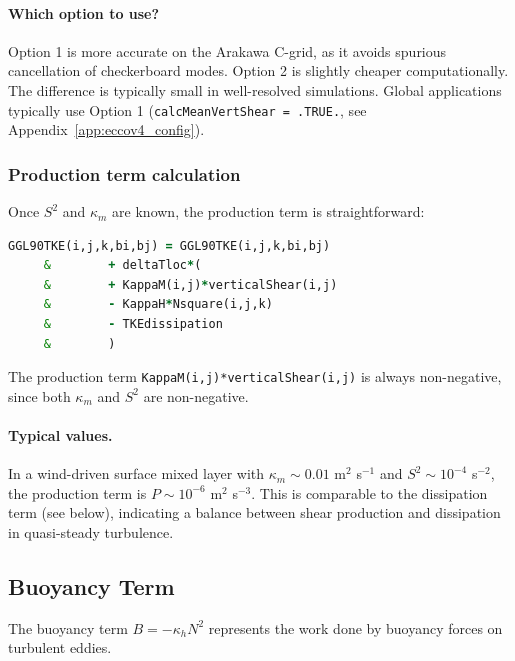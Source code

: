 \documentclass[12pt,letterpaper]{article}
\begin{document}
\paragraph{Which option to use?} Option 1 is more accurate on the Arakawa C-grid, as it avoids spurious cancellation of checkerboard modes. Option 2 is slightly cheaper computationally. The difference is typically small in well-resolved simulations. Global applications typically use Option 1 (\verb|calcMeanVertShear = .TRUE.|, see Appendix~\ref{app:eccov4_config}).

\subsubsection{Production term calculation}

Once $S^2$ and $\kappa_m$ are known, the production term is straightforward:

\begin{lstlisting}[language=Fortran,caption={(ggl90\_calc.F:L605--610) Explicit TKE budget update: production term}]
         GGL90TKE(i,j,k,bi,bj) = GGL90TKE(i,j,k,bi,bj)
     &        + deltaTloc*(
     &        + KappaM(i,j)*verticalShear(i,j)
     &        - KappaH*Nsquare(i,j,k)
     &        - TKEdissipation
     &        )
\end{lstlisting}

The production term \verb|KappaM(i,j)*verticalShear(i,j)| is always non-negative, since both $\kappa_m$ and $S^2$ are non-negative.

\paragraph{Typical values.} In a wind-driven surface mixed layer with $\kappa_m \sim 0.01$ m$^2$ s$^{-1}$ and $S^2 \sim 10^{-4}$ s$^{-2}$, the production term is $P \sim 10^{-6}$ m$^2$ s$^{-3}$. This is comparable to the dissipation term (see below), indicating a balance between shear production and dissipation in quasi-steady turbulence.

\subsection{Buoyancy Term}
\label{sec:tke_buoyancy}

The buoyancy term $B = -\kappa_h N^2$ represents the work done by buoyancy forces on turbulent eddies.
\end{document}

